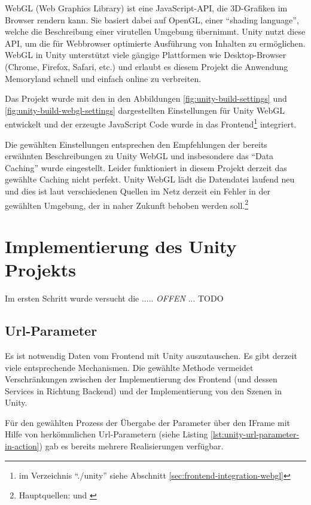 WebGL (Web Graphics Library) ist eine JavaScript-API, die 3D-Grafiken im Browser rendern kann. Sie basiert dabei auf OpenGL, einer ``shading language'', welche die Beschreibung einer virutellen Umgebung übernimmt. Unity nutzt diese API, um die für Webbrowser optimierte Ausführung von Inhalten zu ermöglichen. WebGL in Unity unterstützt viele gängige Plattformen wie Desktop-Browser (Chrome, Firefox, Safari, etc.) und erlaubt es diesem Projekt die Anwendung Memoryland schnell und einfach online zu verbreiten.


Das Projekt wurde mit den in den Abbildungen \ref{fig:unity-build-settings} und \ref{fig:unity-build-webgl-settings} dargestellten Einstellungen für Unity WebGL entwickelt und der erzeugte JavaScript Code wurde in das Frontend\footnote{im Verzeichnis ``./unity'' siehe Abschnitt \ref{sec:frontend-integration-webgl}} integriert.


Die gewählten Einstellungen entsprechen den Empfehlungen der bereits erwähnten Beschreibungen zu Unity WebGL und insbesondere das ``Data Caching'' wurde eingestellt. Leider funktioniert in diesem Projekt derzeit das gewählte Caching nicht perfekt. Unity WebGL lädt die Datendatei laufend neu und dies ist laut verschiedenen Quellen im Netz derzeit ein Fehler in der gewählten Umgebung, der in naher Zukunft behoben werden soll.\footnote{Hauptquellen: \cite{UnityDocsDataCachingIssue} und \cite{UnityDocsDataCachingIssue2}}


\section{Implementierung des Unity Projekts}

Im ersten Schritt wurde versucht die ..... \emph{OFFEN} ... TODO





\subsection{Url-Parameter}
\label{subsec:unity-url-parameter}

Es ist notwendig Daten vom Frontend mit Unity auszutauschen. Es gibt derzeit viele entsprechende Mechanismen. Die gewählte Methode vermeidet Verschränkungen zwischen der Implementierung des Frontend (und dessen Services in Richtung Backend) und der Implementierung von den Szenen in Unity.


Für den gewählten Prozess der Übergabe der Parameter über den IFrame mit Hilfe von herkömmlichen Url-Parametern (siehe Listing \ref{lst:unity-url-parameter-in-action}) gab es bereits mehrere Realisierungen verfügbar. 


